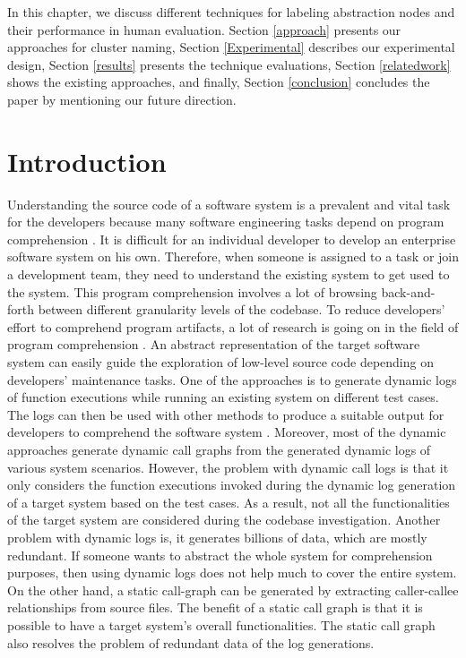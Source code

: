 \label{chapter:hla1}

In this chapter, we discuss different techniques for labeling abstraction nodes and their performance in human evaluation.
Section \ref{approach} presents our approaches for cluster naming, Section \ref{Experimental} describes our experimental design, 
Section \ref{results} presents the technique evaluations, Section \ref{relatedwork} shows the existing approaches,
and finally, Section \ref{conclusion} concludes the paper by mentioning our future direction.  


\section{Introduction}
Understanding the source code of a software system is a prevalent and vital task for the developers because many software engineering tasks depend on program comprehension \cite{cornelissen2009systematic, gilmore1991models, xie2016revisit, feng2018dynamic}. It is difficult for an individual developer to develop an enterprise software system on his own. Therefore, when someone is assigned to a task or join a development team, they need to understand the existing system to get used to the system. This program comprehension involves a lot of browsing back-and-forth between different granularity levels of the codebase. To reduce developers' effort to comprehend program artifacts, a lot of research is going on in the field of program comprehension \cite{feng2018dynamic, gharibi2018automatic, kulkarni2014supporting, izu2019program}. An abstract representation of the target software system can easily guide the exploration of low-level source code depending on developers' maintenance tasks. One of the approaches is to generate dynamic logs of function executions while running an existing system on different test cases. The logs can then be used with other methods to produce a suitable output for developers to comprehend the software system \cite{feng2018dynamic}.
Moreover, most of the dynamic approaches generate dynamic call graphs from the generated dynamic logs of various system scenarios. However, the problem with dynamic call logs is that it only considers the function executions invoked during the dynamic log generation of a target system based on the test cases. As a result, not all the functionalities of the target system are considered during the codebase investigation. Another problem with dynamic logs is, it generates billions of data, which are mostly redundant. If someone wants to abstract the whole system for comprehension purposes, then using dynamic logs does not help much to cover the entire system.
On the other hand, a static call-graph can be generated by extracting caller-callee relationships from source files. The benefit of a static call graph is that it is possible to have a target system's overall functionalities. The static call graph also resolves the problem of redundant data of the log generations.



